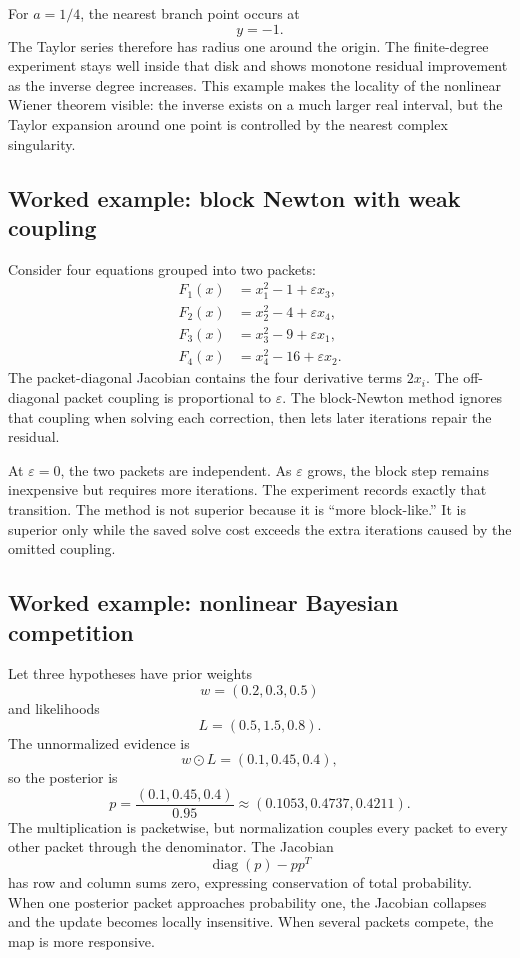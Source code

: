 \documentclass[11pt]{article}
\theoremstyle{definition}
\theoremstyle{remark}
\begin{document}
For $a=1/4$, the nearest branch point occurs at
\[
y=-1.
\]
The Taylor series therefore has radius one around the origin.  The finite-degree experiment stays well inside that disk and shows monotone residual improvement as the inverse degree increases.  This example makes the locality of the nonlinear Wiener theorem visible: the inverse exists on a much larger real interval, but the Taylor expansion around one point is controlled by the nearest complex singularity.

\subsection{Worked example: block Newton with weak coupling}

Consider four equations grouped into two packets:
\[
\begin{aligned}
F_1(x)&=x_1^2-1+\varepsilon x_3,\\
F_2(x)&=x_2^2-4+\varepsilon x_4,\\
F_3(x)&=x_3^2-9+\varepsilon x_1,\\
F_4(x)&=x_4^2-16+\varepsilon x_2.
\end{aligned}
\]
The packet-diagonal Jacobian contains the four derivative terms $2x_i$.  The off-diagonal packet coupling is proportional to $\varepsilon$.  The block-Newton method ignores that coupling when solving each correction, then lets later iterations repair the residual.

At $\varepsilon=0$, the two packets are independent.  As $\varepsilon$ grows, the block step remains inexpensive but requires more iterations.  The experiment records exactly that transition.  The method is not superior because it is ``more block-like.''  It is superior only while the saved solve cost exceeds the extra iterations caused by the omitted coupling.

\subsection{Worked example: nonlinear Bayesian competition}

Let three hypotheses have prior weights
\[
w=(0.2,0.3,0.5)
\]
and likelihoods
\[
L=(0.5,1.5,0.8).
\]
The unnormalized evidence is
\[
w\odot L=(0.1,0.45,0.4),
\]
so the posterior is
\[
p
=
\frac{(0.1,0.45,0.4)}{0.95}
\approx
(0.1053,0.4737,0.4211).
\]
The multiplication is packetwise, but normalization couples every packet to every other packet through the denominator.  The Jacobian
\[
\operatorname{diag}(p)-pp^T
\]
has row and column sums zero, expressing conservation of total probability.  When one posterior packet approaches probability one, the Jacobian collapses and the update becomes locally insensitive.  When several packets compete, the map is more responsive.
\end{document}
